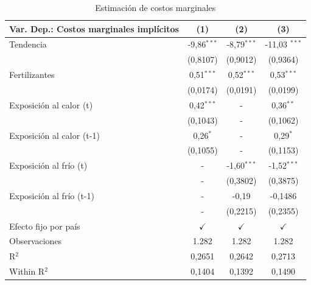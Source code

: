 \begin{table}[H]
   \caption{Estimación de costos marginales}
   \label{tab:estimacion_costos}
   \bigskip
   \centering
   \begin{tabular}{lccc}

      \hline 
      
      Var. Dep.: Costos marginales implícitos                     & (1) & (2) & (3)\\   
      \hline

      Tendencia             & -9,86$^{***}$ & -8,79$^{***}$ & -11,03 $^{***}$ \\   
                           & (0,8107) & (0,9012) & (0,9364) \\   
      Fertilizantes        & 0,51$^{***}$ & 0,52$^{***}$ & 0,53$^{***}$ \\   
                           & (0,0174) & (0,0191) & (0,0199)\\   
      Exposición al calor (t)      & 0,42$^{***}$ & - & 0,36$^{**}$ \\   
                           & (0,1043) & - & (0,1062) \\   
      Exposición al calor (t-1)      & 0,26$^{*}$ & - & 0,29$^{*}$ \\   
                           & (0,1055) & - & (0,1153)\\   
      Exposición al frío (t)      & - & -1,60$^{***}$ & -1,52$^{***}$ \\   
                           & - & (0,3802) & (0,3875)\\   
      Exposición al frío (t-1)      & - & -0,19 & -0,1486\\   
                           & - & (0,2215) & (0,2355)\\  
      \hline
      Efecto fijo por país & $\checkmark$ & $\checkmark$ & $\checkmark$ \\  
      \hline
      Observaciones          & 1.282 & 1.282 & 1.282\\  
      R$^2$                 & 0,2651 & 0,2642 & 0,2713\\  
      Within R$^2$          & 0,1404 & 0,1392 & 0,1490\\        
      \bottomrule
   \end{tabular}
   \par \raggedright 
\end{table}



